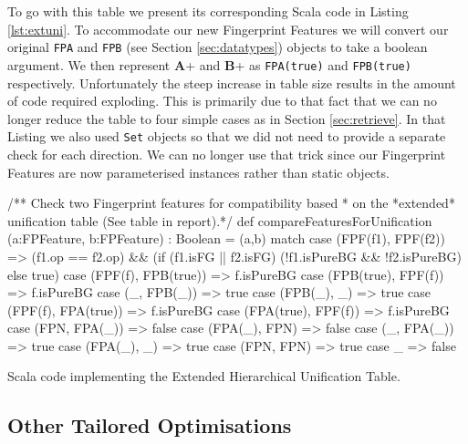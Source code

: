To go with this table we present its corresponding Scala code in Listing \ref{lst:extuni}.
To accommodate our new Fingerprint Features we will convert our original \verb!FPA! and \verb!FPB!
(see Section \ref{sec:datatypes}) objects to take a boolean argument.
We then represent \textbf{A}+ and \textbf{B}+ as \verb!FPA(true)! and \verb!FPB(true)! respectively.
Unfortunately the steep increase in table size results in the amount of code required exploding.
This is primarily due to that fact that we can no longer reduce the table to four
simple cases as in Section \ref{sec:retrieve}. In that Listing we also
used \verb!Set! objects so that we did not need to provide a separate check for each
direction. We can no longer use that trick since our Fingerprint Features are now
parameterised instances rather than static objects.
\begin{listing}[H]
\begin{scalacode}
 /** Check two Fingerprint features for compatibility based
   * on the *extended* unification table (See table in report).*/
  def compareFeaturesForUnification
      (a:FPFeature, b:FPFeature) : Boolean = 
  (a,b) match {
    case (FPF(f1), FPF(f2))    => (f1.op == f2.op) && 
                                  (if (f1.isFG || f2.isFG) 
                                      (!f1.isPureBG && !f2.isPureBG)
                                   else true)
    case (FPF(f), FPB(true)) => f.isPureBG
    case (FPB(true), FPF(f)) => f.isPureBG
    case (_, FPB(_))         => true
    case (FPB(_), _)         => true
    case (FPF(f), FPA(true)) => f.isPureBG
    case (FPA(true), FPF(f)) => f.isPureBG
    case (FPN, FPA(_))       => false
    case (FPA(_), FPN)       => false
    case (_, FPA(_))         => true
    case (FPA(_), _)         => true
    case (FPN, FPN)          => true
    case _                   => false
  }
\end{scalacode}
\caption{Scala code implementing the Extended Hierarchical Unification Table.}
\label{lst:extuni}
\end{listing}


\subsection{Other Tailored Optimisations}

